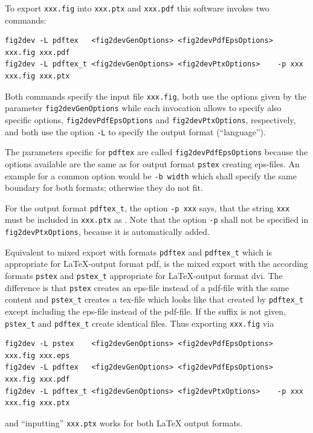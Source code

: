 \documentclass[12pt]{book}
\begin{document}
To export \texttt{xxx.fig} into \texttt{xxx.ptx} and \texttt{xxx.pdf} 
this software invokes two commands: 
%
\begin{Verbatim}[fontsize=\scriptsize]
fig2dev -L pdftex   <fig2devGenOptions> <fig2devPdfEpsOptions>        xxx.fig xxx.pdf   
fig2dev -L pdftex_t <fig2devGenOptions> <fig2devPtxOptions>    -p xxx xxx.fig xxx.ptx
\end{Verbatim}
%
Both commands specify the input file \texttt{xxx.fig}, 
both use the options given by the parameter \texttt{fig2devGenOptions} 
while each invocation allows to specify also specific options, 
\texttt{fig2devPdfEpsOptions} and \texttt{fig2devPtxOptions}, respectively, 
and both use the option \texttt{-L} 
to specify the output format (``language''). 


The parameters specific for \texttt{pdftex} 
are called \texttt{fig2devPdfEpsOptions} 
because the options available are the same 
as for output format \texttt{pstex} creating eps-files. 
An example for a common option would be \texttt{-b width} 
which shall specify the same boundary for both formats; 
otherwise they do not fit. 

For the output format \texttt{pdftex\_t}, 
the option \texttt{-p xxx} says, 
that the string \texttt{xxx} must be included in \texttt{xxx.ptx} 
as . 
Note that the option \texttt{-p} shall not be specified 
in \texttt{fig2devPtxOptions}, because it is automatically added. 

Equivalent to mixed export with formats \texttt{pdftex} and \texttt{pdftex\_t} 
which is appropriate for \LaTeX-output format pdf, 
is the mixed export with the according formats 
\texttt{pstex} and \texttt{pstex\_t} appropriate for \LaTeX-output format dvi. 
The difference is that \texttt{pstex} creates an eps-file instead of a pdf-file 
with the same content 
and \texttt{pstex\_t} creates a tex-file which looks like that 
created by \texttt{pdftex\_t} except including the eps-file 
instead of the pdf-file. 
If the suffix is not given, 
\texttt{pstex\_t} and \texttt{pdftex\_t} create identical files. 
Thus exporting \texttt{xxx.fig} via 
%
\begin{Verbatim}[fontsize=\scriptsize]
fig2dev -L pstex    <fig2devGenOptions> <fig2devPdfEpsOptions>        xxx.fig xxx.eps   
fig2dev -L pdftex   <fig2devGenOptions> <fig2devPdfEpsOptions>        xxx.fig xxx.pdf   
fig2dev -L pdftex_t <fig2devGenOptions> <fig2devPtxOptions>    -p xxx xxx.fig xxx.ptx
\end{Verbatim}
%
and ``inputting'' \texttt{xxx.ptx} works for both \LaTeX{} output formats. 
\end{document}
